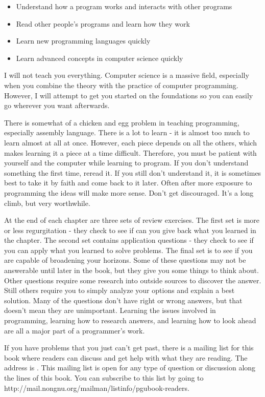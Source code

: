 \begin{itemize}
\item Understand how a program works and interacts with other programs 
\item Read other people's programs and learn how they work 
\item Learn new programming languages quickly 
\item Learn advanced concepts in computer science quickly 
\end{itemize}

I will not teach you everything.  Computer science is a massive
field, especially when you combine the theory with the practice of computer
programming.  However, I will attempt to get you started on the 
foundations so you can easily go wherever you want afterwards.

There is somewhat of a chicken and egg problem in teaching programming,
especially assembly language.  There is a lot to learn - it is almost too
much to learn almost at all at once.  However, each piece depends on all 
the others, which makes learning it a piece at a time difficult.
Therefore, you must be patient with yourself and the computer while 
learning to program.  If you don't understand something the first time,
reread it.  If you still don't understand it, it is sometimes best to
take it by faith and come back to it later.  Often after more exposure
to programming the ideas will make more sense.  Don't get discouraged.
It's a long climb, but very worthwhile.

At the end of each chapter are three sets of review exercises.  The first
set is more or less regurgitation - they check to see if can you give 
back what you learned in the chapter.  The second set contains application 
questions - they check to see if you can apply what you learned to solve 
problems.  The final set is to see if you are capable of broadening your
horizons.  Some of these questions may not be answerable until later in
the book, but they give you some things to think about.  Other questions
require some research into outside sources to discover the answer.  Still
others require you to simply analyze your options and explain a best solution.
Many of the questions don't have right or wrong answers, but that doesn't mean
they are unimportant.  Learning the issues involved in programming, learning
how to research answers, and learning how to look ahead are all a major
part of a programmer's work. 

If you have problems that you just can't get past, there is a mailing list
for this book where readers can discuss and get help with what they are
reading.  The address is .
This mailing list is open for any type of question or discussion along the
lines of this book.  You can subscribe to this list by going to http://mail.nongnu.org/mailman/listinfo/pgubook-readers.

